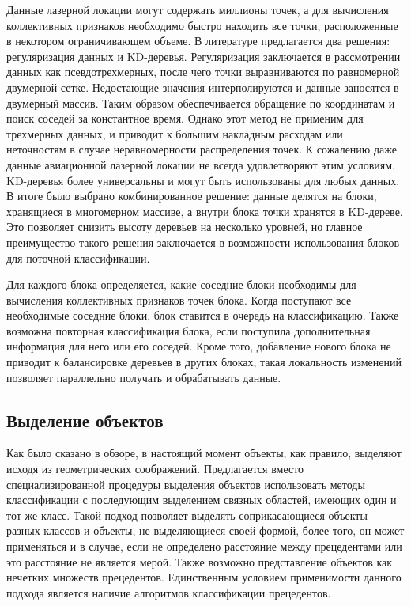 Данные лазерной локации могут содержать миллионы точек, а для вычисления коллективных признаков необходимо быстро находить все точки, расположенные в некотором ограничивающем объеме. В литературе предлагается два решения: регуляризация данных и KD-деревья. Регуляризация заключается в рассмотрении данных как псевдотрехмерных, после чего точки выравниваются по равномерной двумерной сетке\cite{Amin}. Недостающие значения интерполируются и данные заносятся в двумерный массив. Таким образом обеспечивается обращение по координатам и поиск соседей за константное время. Однако этот метод не применим для трехмерных данных, и приводит к большим накладным расходам или неточностям в случае неравномерности распределения точек. К сожалению даже данные авиационной лазерной локации не всегда удовлетворяют этим условиям. KD-деревья более универсальны и могут быть использованы для любых данных. В итоге было выбрано комбинированное решение: данные делятся на блоки, хранящиеся в многомерном массиве, а внутри блока точки хранятся в KD-дереве. Это позволяет снизить высоту деревьев на несколько уровней, но главное преимущество такого решения заключается в возможности использования блоков для поточной классификации.

Для каждого блока определяется, какие соседние блоки необходимы для вычисления коллективных признаков точек блока. Когда поступают все необходимые соседние блоки, блок ставится в очередь на классификацию. Также возможна повторная классификация блока, если поступила дополнительная информация для него или его соседей. Кроме того, добавление нового блока не приводит к балансировке деревьев в других блоках, такая локальность изменений позволяет параллельно получать и обрабатывать данные.

\subsection{Выделение объектов}

Как было сказано в обзоре, в настоящий момент объекты, как правило, выделяют исходя из геометрических соображений.
Предлагается вместо специализированной процедуры выделения объектов использовать методы классификации с последующим выделением связных областей, имеющих один и тот же класс. Такой подход позволяет выделять соприкасающиеся объекты разных классов и объекты, не выделяющиеся своей формой, более того, он может применяться и в случае, если не определено расстояние между прецедентами или это расстояние не является мерой. Также возможно представление объектов как нечетких множеств прецедентов. Единственным условием применимости данного подхода является наличие алгоритмов классификации прецедентов.

